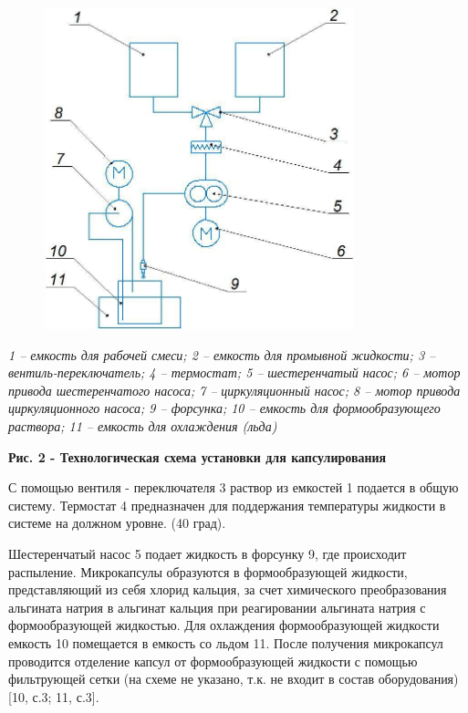 \begin{figure}[H]
	\centering
	\includegraphics[width=0.8\textwidth]{assets/311}
	\caption*{}
\end{figure}

\emph{1 -- емкость для рабочей смеси; 2 -- емкость для промывной
жидкости; 3 -- вентиль-переключатель; 4 -- термостат; 5 --}
\emph{шестеренчатый насос; 6 -- мотор привода шестеренчатого насоса; 7
--} \emph{циркуляционный насос; 8 -- мотор привода циркуляционного
насоса; 9 -- форсунка; 10 -- емкость для формообразующего раствора; 11
-- емкость для охлаждения (льда)}

{\bfseries Рис. 2 - Технологическая схема установки для капсулирования}

С помощью вентиля - переключателя 3 раствор из емкостей 1 подается в
общую систему. Термостат 4 предназначен для поддержания температуры
жидкости в системе на должном уровне. (40 град).

Шестеренчатый насос 5 подает жидкость в форсунку 9, где происходит
распыление. Микрокапсулы образуются в формообразующей жидкости,
представляющий из себя хлорид кальция, за счет химического
преобразования альгината натрия в альгинат кальция при реагировании
альгината натрия с формообразующей жидкостью. Для охлаждения
формообразующей жидкости емкость 10 помещается в емкость со льдом 11.
После получения микрокапсул проводится отделение капсул от
формообразующей жидкости с помощью фильтрующей сетки (на схеме не
указано, т.к. не входит в состав оборудования) {[}10, с.3; 11, с.3{]}.

